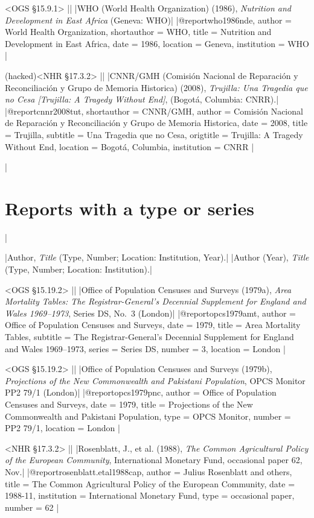 \documentclass[extrafontsizes,11pt,a4paper,oneside]{memoir}
\begin{document}
\bibexample<OGS \S15.9.1>
||%
|WHO (World Health Organization) (1986), \emph{Nutrition and Development in East Africa} (Geneva: WHO)|%
|@report{who1986nde,
  author = {{World Health Organization}},
  shortauthor = {WHO},
  title = {Nutrition and Development in {East Africa}},
  date = {1986},
  location = {Geneva},
  institution = {WHO}
}|

\bibexample(hacked)<NHR \S17.3.2>
||%
|CNNR/GMH (Comisión Nacional de Reparación y Reconciliación y Grupo de Memoria Historica) (2008), \emph{Trujilla: Una Tragedia que no Cesa [Trujilla: A Tragedy Without End]}, (Bogotá, Columbia: CNRR).|%
|@report{cnnr2008tut,
  shortauthor = {CNNR/GMH},
  author = {{Comisión Nacional de Reparación y Reconciliación y Grupo de Memoria Historica}},
  date = {2008},
  title = {Trujilla},
  subtitle = {Una Tragedia que no Cesa},
  origtitle = {{Trujilla:} {A} Tragedy Without End},
  location = {Bogotá, Columbia},
  institution = {CNRR}
}|

\todoc|
\section{Reports with a type or series}
|

\specs
|Author, \emph{Title} (Type, Number; Location: Institution, Year).|%
|Author (Year), \emph{Title} (Type, Number; Location: Institution).|

\bibexample<OGS \S15.19.2>
||%
|Office of Population Censuses and Surveys (1979a), \emph{Area Mortality Tables: The Registrar-General's Decennial Supplement for England and Wales 1969–1973}, Series DS, No.~3 (London)|%
|@report{opcs1979amt,
  author = {{Office of Population Censuses and Surveys}},
  date = {1979},
  title = {Area Mortality Tables},
  subtitle = {The Registrar-General's Decennial Supplement for England and Wales 1969–1973},
  series = {Series DS},
  number = {3},
  location = {London}
}|

\bibexample<OGS \S15.19.2>
||%
|Office of Population Censuses and Surveys (1979b), \emph{Projections of the New Commonwealth and Pakistani Population}, OPCS Monitor PP2 79/1 (London)|%
|@report{opcs1979pnc,
  author = {{Office of Population Censuses and Surveys}},
  date = {1979},
  title = {Projections of the {New Commonwealth} and {Pakistani} Population},
  type = {OPCS Monitor},
  number = {PP2 79/1},
  location = {London}
}|

\bibexample<NHR \S17.3.2>
||%
|Rosenblatt, J., et al. (1988), \emph{The Common Agricultural Policy of the European Community}, International Monetary Fund, occasional paper 62, Nov.|%
|@report{rosenblatt.etal1988cap,
  author = {Julius Rosenblatt and others},
  title = {The {Common Agricultural Policy} of the {European Community}},
  date = {1988-11},
  institution = {International Monetary Fund},
  type = {occasional paper},
  number = {62}
}|%
\end{document}
